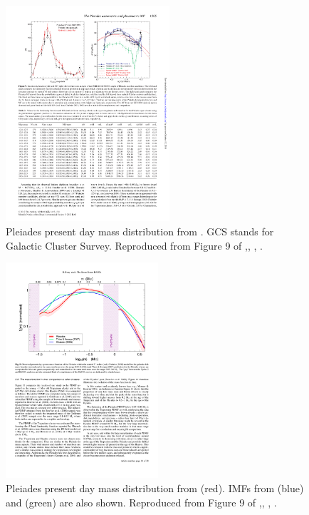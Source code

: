 \begin{figure}[ht!]
\begin{center}
\includegraphics[height=8cm]{background/Figures/F9b_Lodieu2012.pdf}
\caption{Pleiades present day mass distribution from \citet{Lodieu2012}. GCS stands for Galactic Cluster Survey. Reproduced from Figure 9 of \citet{Lodieu2012},\textit{}, , .}
\label{fig:massLodieu}
\end{center}
\end{figure}

\begin{figure}[ht!]
\begin{center}
\includegraphics[height=8cm]{background/Figures/F9_Bouy2015.pdf}
\caption{Pleiades present day mass distribution  from \citet{Bouy2015} (red). IMFs from \citet{Chabrier2005}(blue) and \citet{Thies2007} (green) are also shown. Reproduced from Figure 9 of \citet{Bouy2015},\textit{}, , .}
\label{fig:massBouy}
\end{center}
\end{figure}

